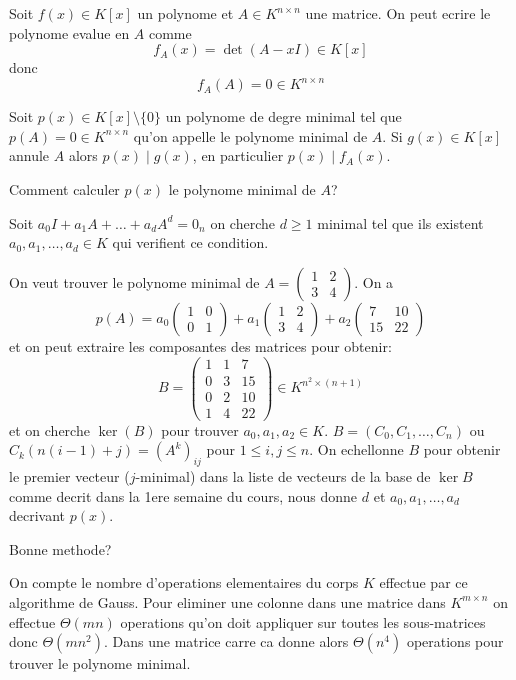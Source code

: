 
\begin{theorem}\label{cayley}
Soit  $f(x)\in K[x]$ un polynome et $A\in K^{n\times n}$ une matrice. On peut ecrire le polynome evalue en $A$ comme 
$$
f_{A}(x)=\det(A-xI)\in K[x]
$$
donc 
$$
f_{A}(A)=0\in K^{n\times n}
$$
\end{theorem}
Soit $p(x)\in K[x]\setminus \{ 0 \}$ un polynome de degre minimal tel que $p(A)=0\in K^{n\times n}$ qu'on appelle le polynome minimal de $A$. Si $g(x)\in K[x]$ annule $A$ alors  $p(x)\mid g(x)$, en particulier $p(x)\mid f_{A}(x)$.

\begin{question}
Comment calculer $p(x)$ le polynome minimal de $A$?
\end{question}
\begin{answer}
Soit $a_{0}I+a_{1}A+\dots +a_{d}A^{d}=0_{n}$ on cherche $d\ge 1$ minimal tel que ils existent $a_{0},a_{1},\dots,a_{d}\in K$ qui verifient ce condition.
\begin{example}
On veut trouver le polynome minimal de $A=\begin{pmatrix}1 & 2 \\ 3 & 4\end{pmatrix}$. On a
$$
p(A)=a_{0}\begin{pmatrix}
1 & 0 \\
0 & 1
\end{pmatrix}+a_{1}\begin{pmatrix}
1 & 2 \\
 3 & 4
\end{pmatrix}+a_{2}\begin{pmatrix}
7 & 10 \\
15 & 22
\end{pmatrix}
$$
et on peut extraire les composantes des matrices pour obtenir:
$$B=
\begin{pmatrix}
1 & 1 &  7 \\
0 & 3 & 15 \\
0 & 2 & 10 \\
1 & 4 & 22
\end{pmatrix}\in K^{n^{2}\times(n+1)}
$$
et on cherche $\ker(B)$ pour trouver $a_{0},a_{1},a_{2}\in K$. $B=(C_{0},C_{1},\dots,C_{n})$ ou $C_{k}(n(i-1)+j)=(A^{k})_{ij}$ pour $1\le i,j\le n$. On echellonne $B$ pour obtenir le premier vecteur ($j$-minimal) dans la liste de vecteurs de la base de $\ker B$ comme decrit dans la 1ere semaine du cours, nous donne $d$ et $a_{0},a_{1},\dots,a_{d}$ decrivant $p(x)$.
\end{example}
\end{answer}
\begin{question}
Bonne methode?
\end{question}
\begin{answer}
On compte le nombre d'operations elementaires du corps $K$ effectue par ce algorithme de Gauss. Pour eliminer une colonne dans une matrice dans $K^{m\times n}$ on effectue $\Theta(mn)$ operations qu'on doit appliquer sur toutes les sous-matrices donc $\Theta(mn^{2})$. Dans une matrice carre ca donne alors $\Theta(n^{4})$ operations pour trouver le polynome minimal.
\end{answer}

